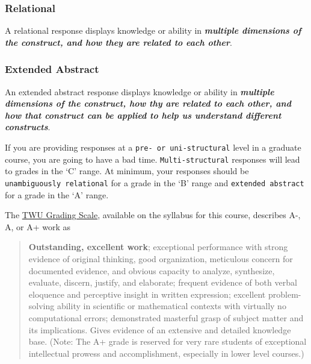 \documentclass[
]{book}
\begin{document}
\hypertarget{relational}{%
\subsubsection*{Relational}\label{relational}}

A relational response displays knowledge or ability in \textbf{\emph{multiple dimensions of the construct, and how they are related to each other}}.

\hypertarget{extended-abstract}{%
\subsubsection*{Extended Abstract}\label{extended-abstract}}

An extended abstract response displays knowledge or ability in \textbf{\emph{multiple dimensions of the construct, how thy are related to each other, and how that construct can be applied to help us understand different constructs}}.

If you are providing responses at a \texttt{pre-\ or\ uni-structural} level in a graduate course, you are going to have a bad time. \texttt{Multi-structural} responses will lead to grades in the `C' range. At minimum, your responses should be \texttt{unambiguously\ relational} for a grade in the `B' range and \texttt{extended\ abstract} for a grade in the `A' range.

The \href{https://www.twu.ca/about/policies-guidelines/university-standard-grading-system}{TWU Grading Scale}, available on the syllabus for this course, describes A-, A, or A+ work as

\begin{quote}
\textbf{Outstanding, excellent work}; exceptional performance with strong evidence of original thinking, good organization, meticulous concern for documented evidence, and obvious capacity to analyze, synthesize, evaluate, discern, justify, and elaborate; frequent evidence of both verbal eloquence and perceptive insight in written expression; excellent problem-solving ability in scientific or mathematical contexts with virtually no computational errors; demonstrated masterful grasp of subject matter and its implications. Gives evidence of an extensive and detailed knowledge base. (Note: The A+ grade is reserved for very rare students of exceptional intellectual prowess and accomplishment, especially in lower level courses.)
\end{quote}
\end{document}
